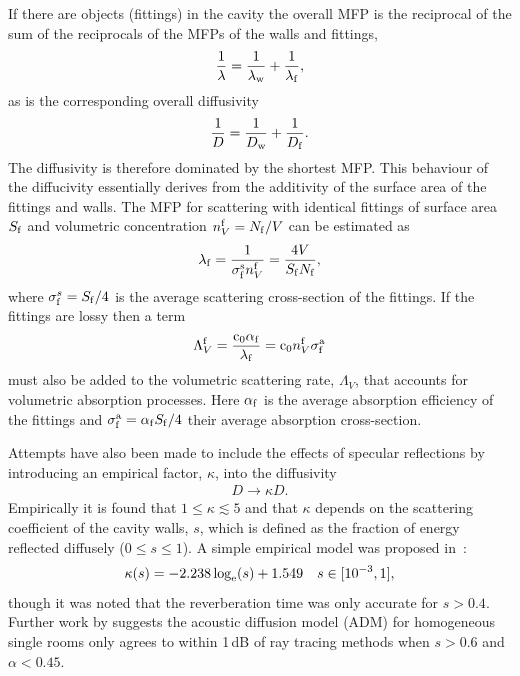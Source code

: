 \documentclass[a4paper]{article}
\numberwithin{equation}{section}
\begin{document}
If there are objects (fittings) in the cavity the overall MFP is the reciprocal of the 
sum of the reciprocals of the MFPs of the walls and fittings,
\begin{align}
\label{eq:harmmean}
\frac{1}{\lambda} = \frac{1}{\lambda_{\mathrm{w}}} + \frac{1}{\lambda_{\mathrm{f}}},
\end{align}
as is the corresponding overall diffusivity~\citep{Valeau2007}
\begin{align}
\frac{1}{D} = \frac{1}{D_{\mathrm{w}}} + \frac{1}{D_{\mathrm{f}}}.
\end{align}
The diffusivity is therefore dominated by the shortest MFP. This behaviour
of the diffucivity essentially derives from the additivity of the surface area
of the fittings and walls. The MFP for scattering with identical fittings of 
surface area $S_{\mathrm{f}}$ and volumetric
concentration $n_V^{\mathrm{f}}=N_{\mathrm{f}}/V$ can be estimated as~\citep{Valeau2007}
\begin{align}
\lambda_{\mathrm{f}} = \frac{1}{\sigma_{\mathrm{f}}^{\mathrm{s}} n_V^{\mathrm{f}}} = \frac{4V}{S_{\mathrm{f}} N_{\mathrm{f}}},
\end{align}
where $\sigma_{\mathrm{f}}^s=S_{\mathrm{f}}/4$ is the average scattering cross-section of the
fittings. If the fittings are lossy then a term
\begin{align}
\Lambda_V^{\mathrm{f}} = \frac{\mathrm{c}_0\alpha_{\mathrm{f}}}{\lambda_{\mathrm{f}}} = \mathrm{c}_0 n_V^{\mathrm{f}} \sigma_{\mathrm{f}}^{\mathrm{a}}
\end{align}
must also be added to the volumetric scattering rate, $\Lambda_V$, that accounts
for volumetric absorption processes. Here $\alpha_{\mathrm{f}}$ is the average
absorption efficiency of the fittings and $\sigma_{\mathrm{f}}^{\mathrm{a}}=\alpha_{\mathrm{f}} S_{\mathrm{f}}/4$ their
average absorption cross-section.

Attempts have also been made to include the effects of specular reflections by
introducing an empirical factor, ${\kappa}$, into the diffusivity~\citep{Foy2009} 
\begin{align}
\label{eq:kappa}
D \rightarrow \kappa D .
\end{align}
Empirically it is found that $1\leq\kappa\lesssim 5$ and that $\kappa$ depends on the 
scattering coefficient of the cavity walls, $s$, which is defined as the fraction
of energy reflected diffusely ($0 \leq s \leq 1$). A simple empirical model was proposed
in~\citep{Foy2009}:
\begin{align}
\kappa(s) = -2.238\log_{\mathrm{e}}(s) + 1.549 \,\,\,\,\,\,s\in [10^{-3},1],
\end{align}
though it was noted that the reverberation time was only accurate for $s>0.4$. Further
work by \cite{Navarro2013} suggests the acoustic diffusion model (ADM) for homogeneous single 
rooms only agrees to within 1\,dB of ray tracing methods when $s>0.6$ and $\alpha<0.45$.
\end{document}
